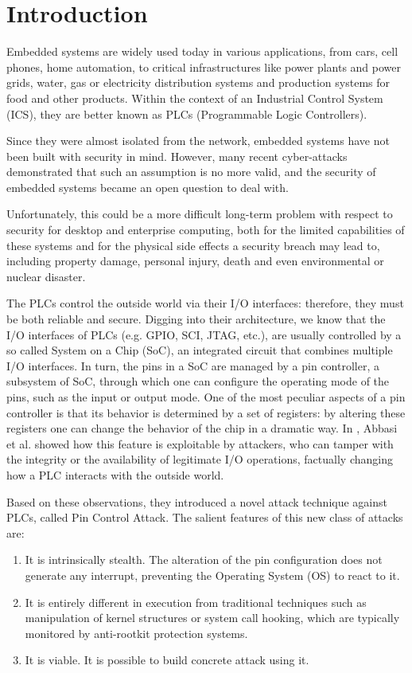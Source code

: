 \chapter{Introduction}
\label{chap:intro}

Embedded systems are widely used today in various applications, from cars, cell phones, home automation, to critical infrastructures
like power plants and power grids, water, gas or electricity distribution systems and production systems for food and other products.
Within the context of an Industrial Control System (ICS), they are better known as PLCs (Programmable Logic Controllers).

Since they were almost isolated from the network, embedded systems have not been built with security in mind.
However, many recent cyber-attacks demonstrated that such an assumption is no more valid, and the security of embedded systems became an open question to deal with.

Unfortunately, this could be a more difficult long-term problem with respect to security for desktop and enterprise computing,
both for the limited capabilities of these systems and for the physical side effects a security breach may lead to, including property damage, personal injury, death and
even environmental or nuclear disaster.

The PLCs control the outside world via their I/O interfaces: therefore, they must be both reliable and secure.
Digging into their architecture, we know that the I/O interfaces of PLCs (e.g. GPIO, SCI, JTAG, etc.),
are usually controlled by a so called System on a Chip (SoC), an integrated circuit that combines multiple I/O interfaces.
In turn, the pins in a SoC are managed by a pin controller, a subsystem of SoC, through which one can configure the operating mode of the pins, such as the input or output mode.
One of the most peculiar aspects of a pin controller is that its behavior is determined by a set of registers: by altering these registers one can change the behavior
of the chip in a dramatic way. In \cite{ghostplc}, Abbasi et al. showed how this feature is exploitable by attackers, who can tamper with
the integrity or the availability of legitimate I/O operations, factually changing how a PLC interacts with the outside world.

Based on these observations, they introduced a novel attack technique against PLCs, called Pin Control Attack.
The salient features of this new class of attacks are:
\begin{enumerate}
	\item It is intrinsically stealth. The alteration of the pin configuration does not generate any interrupt, preventing the Operating System (OS) to react to it.
	\item It is entirely different in execution from traditional techniques such as manipulation of kernel structures or system call hooking, which are typically
		monitored by anti-rootkit protection systems.
	\item It is viable. It is possible to build concrete attack using it.
\end{enumerate}

